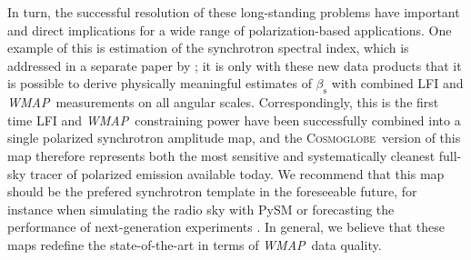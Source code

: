 \documentclass[twocolumn]{../../common/aa}
\def\WMAP{\emph{WMAP}}
\def\WMAPnine{\emph{WMAP9}}
\def\planck{\emph{Planck}}
\def\Planck{\emph{Planck}}
\newcommand{\cosmoglobe}{\textsc{Cosmoglobe}}
\newcommand{\K}[0]{\textit K}
\begin{document}
In turn, the successful resolution of these long-standing problems have important and direct implications for a wide range of polarization-based applications. One example of this is estimation of the synchrotron spectral index, which is addressed in a separate paper by \citet{fuskeland:2023}; it is only with these new data products that it is possible to derive physically meaningful estimates of $\beta_{\mathrm{s}}$ with combined LFI and \WMAP\ measurements on all angular scales. Correspondingly, this is the first time LFI and \WMAP\ constraining power have been successfully combined into a single polarized synchrotron amplitude map, and the \cosmoglobe\ version of this map therefore represents both the most sensitive and systematically cleanest full-sky tracer of polarized emission available today. We recommend that this map should be the prefered synchrotron template in the foreseeable future, for instance when simulating the radio sky with PySM \citep{pysm} or forecasting the performance of next-generation experiments \citep[e.g.,][]{ptep,aurlien:2022}. In general, we believe that these maps redefine the state-of-the-art in terms of \WMAP\ data quality.


\end{document}
